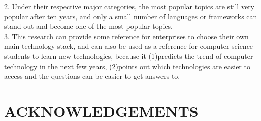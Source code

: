 \documentclass[conference]{IEEEtran}
\begin{document}
2. Under their respective major categories, the most popular topics are still very popular after ten years, and only a small number of languages or frameworks can stand out and become one of the most popular topics.\\


3. This research can provide some reference for enterprises to choose their own main technology stack, and can also be used as a reference for computer science students to learn new technologies, because it (1)predicts the trend of computer technology in the next few years, (2)points out which technologies are easier to access and the questions can be easier to get answers to.\\



\section{ACKNOWLEDGEMENTS}




\end{document}
